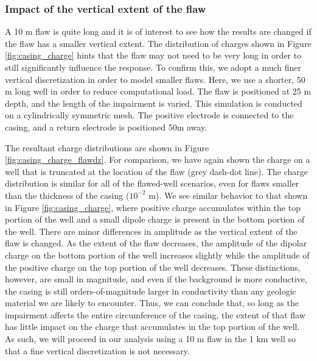 \documentclass[extra,mreferee]{gji}
\begin{document}




\subsubsection{Impact of the vertical extent of the flaw}

A 10 m flaw is quite long and it is of interest to see how the results are changed if the flaw has a smaller vertical extent. The distribution of charges shown in Figure \ref{fig:casing_charge} hints that the flaw may not need to be very long in order to still significantly influence the response. To confirm this, we adopt a much finer vertical discretization in order to model smaller flaws. Here, we use a shorter, 50 m long well in order to reduce computational load. The flaw is positioned at 25 m depth, and the length of the impairment is varied. This simulation is conducted on a cylindrically symmetric mesh. The positive electrode is connected to the casing, and a return electrode is positioned 50m away.

The resultant charge distributions are shown in Figure \ref{fig:casing_charge_flawdz}. For comparison, we have again shown the charge on a well that is truncated at the location of the flaw (grey dash-dot line). The charge distribution is similar for all of the flawed-well scenarios, even for flaws smaller than the thickness of the casing ($10^{-2}$ m). We see similar behavior to that shown in Figure \ref{fig:casing_charge}, where positive charge accumulates within the top portion of the well and a small dipole charge is present in the bottom portion of the well. There are minor differences in amplitude as the vertical extent of the flaw is changed. As the extent of the flaw decreases, the amplitude of the dipolar charge on the bottom portion of the well increases slightly while the amplitude of the positive charge on the top portion of the well decreases. These distinctions, however, are small in magnitude, and even if the background is more conductive, the casing is still orders-of-magnitude larger in conductivity than any geologic material we are likely to encounter. Thus, we can conclude that, so long as the impairment affects the entire circumference of the casing, the extent of that flaw has little impact on the charge that accumulates in the top portion of the well. As such, we will proceed in our analysis using a 10 m flaw in the 1 km well so that a fine vertical discretization is not necessary.


\end{document}

